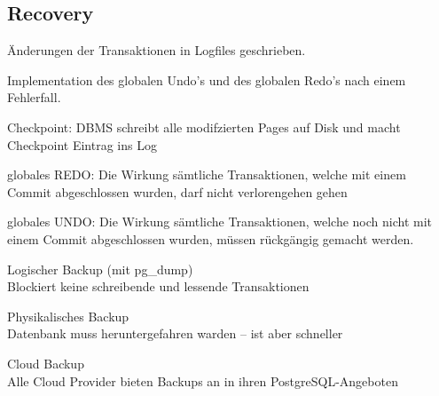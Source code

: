\documentclass[10pt,landscape,a4paper]{scrartcl}
\newcommand{\drule}[3][0]{%
	\tikz[baseline]{\path[decoration={markings,
			mark=between positions 0 and 1 step 2*#3
			with {\node[fill, circle, minimum width=#3, inner sep=0pt, anchor=south west] {};}},postaction={decorate}]  (0,#1) -- ++(#2,0);}}
\begin{document}
\begin{multicols*}{5}
\section{Recovery}
Änderungen der Transaktionen in Logfiles geschrieben.
\begin{compactitem}[$\bullet$]
	\item Implementation des globalen Undo's und des globalen Redo's nach einem Fehlerfall.
	\item Checkpoint: DBMS schreibt alle modifzierten Pages auf Disk und macht Checkpoint Eintrag ins Log
	\item globales REDO: Die Wirkung sämtliche Transaktionen, welche mit einem Commit abgeschlossen
	wurden, darf nicht verlorengehen gehen
	\item globales UNDO: Die Wirkung sämtliche Transaktionen, welche noch nicht mit einem Commit
	abgeschlossen wurden, müssen rückgängig gemacht werden. 
\end{compactitem}
\vspace{-8pt}
\drule{5.5cm}{1pt}
\begin{compactitem} [$\bullet$]
	\item \textcolor{b}{Logischer Backup} (mit pg\_dump)\\
	Blockiert keine schreibende und lessende Transaktionen
	\item \textcolor{b}{Physikalisches Backup}\\
	Datenbank muss heruntergefahren warden – ist aber schneller
	\item \textcolor{b}{Cloud Backup}\\
	Alle Cloud Provider bieten Backups an in ihren PostgreSQL-Angeboten
\end{compactitem}
\vspace{-8pt}

\end{multicols*}
\end{document}
